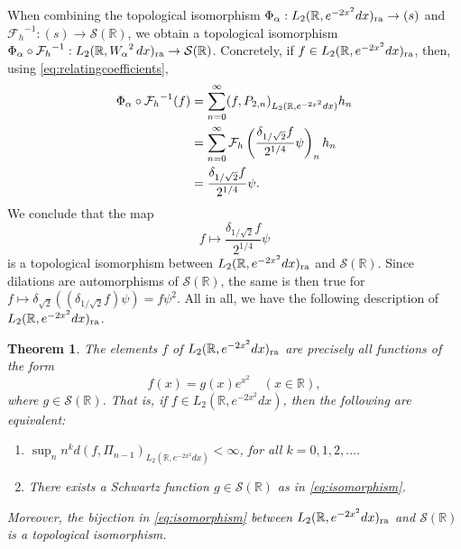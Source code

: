 \documentclass[12pt, reqno]{amsart}
\numberwithin{equation}{section}
\theoremstyle{plain}
\newtheorem{theorem}{Theorem}[section]
\theoremstyle{definition}
\begin{document}
When combining the topological isomorphism ${{{\Phi}}_\alpha}:{L_2({{\mathbb R}},e^{-2x^2}dx)_{\textup{ra}}}\to(s)$ and ${{\mathcal F}_h}^{-1}:(s)\to {{\mathcal S}}({{\mathbb R}})$, we obtain a topological isomorphism ${{{\Phi}}_\alpha}\circ{{\mathcal F}_h}^{-1}: {L_2({{\mathbb R}},{W_\alpha}^2\,dx)_{\textup{ra}}}\to{{\mathcal S}}({{\mathbb R}})$. Concretely, if $f\in{L_2({{\mathbb R}},e^{-2x^2}dx)_{\textup{ra}}}$, then, using \eqref{eq:relatingcoefficients},
\begin{align*}
 {{{\Phi}}_\alpha}\circ{{\mathcal F}_h}^{-1}(f)&=\sum_{n=0}^\infty (f,P_{2,n})_{L_2({{\mathbb R}}, e^{-2x^2}dx)} h_n\notag\\
 &=\sum_{n=0}^\infty{{\mathcal F}_h}\left(\frac{\delta_{1/\sqrt 2}f}{2^{1/4}}\psi\right)_n h_n\\
 &=\frac{\delta_{1/\sqrt 2}f}{2^{1/4}}\psi.
\end{align*}
We conclude that the map
$$
f\mapsto \frac{\delta_{1/\sqrt 2}f}{2^{1/4}}\psi
$$
is a topological isomorphism between ${L_2({{\mathbb R}},e^{-2x^2}dx)_{\textup{ra}}}$ and ${{\mathcal S}}({{\mathbb R}})$. Since dilations are automorphisms of ${{\mathcal S}}({{\mathbb R}})$, the same is then true for $f\mapsto\delta_{\sqrt 2}((\delta_{1/\sqrt 2}f) \psi)=f\psi^2$. All in all, we have the following description of ${L_2({{\mathbb R}},e^{-2x^2}dx)_{\textup{ra}}}$.

\begin{theorem}\label{the:alphaistwo}
The elements $f$ of ${L_2({{\mathbb R}},e^{-2x^2}dx)_{\textup{ra}}}$ are precisely all functions of the form
\begin{equation}\label{eq:isomorphism}
f(x)=g(x)e^{x^2}\quad(x\in{{\mathbb R}}),
\end{equation}
where $g\in{{\mathcal S}}({{\mathbb R}})$. That is, if $f\in {L_2({{\mathbb R}}, e^{-2x^2}dx)}$, then the following are equivalent:
\begin{enumerate}
\item $\sup_n n^k d(f,\Pi_{n-1})_{L_2({{\mathbb R}}, e^{-2x^2}dx)}<\infty$, for all $k=0,1,2,\ldots$.
\item There exists a Schwartz function $g\in{{\mathcal S}}({{\mathbb R}})$ as in \eqref{eq:isomorphism}.
\end{enumerate}

Moreover, the bijection in \eqref{eq:isomorphism} between ${L_2({{\mathbb R}},e^{-2x^2}dx)_{\textup{ra}}}$ and ${{\mathcal S}}({{\mathbb R}})$ is a topological isomorphism.
\end{theorem}
\end{document}
